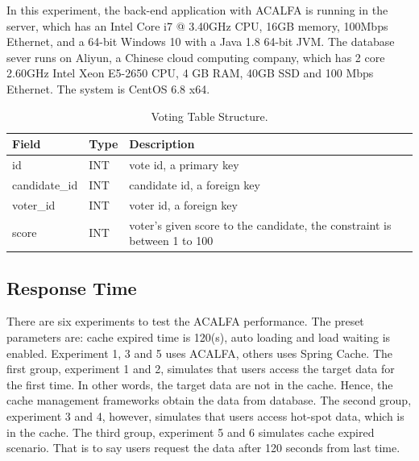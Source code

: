 \documentclass{singlecol-new}
\theoremstyle{TH}{
\newtheorem{lemma}{Lemma}
\newtheorem{theorem}[lemma]{Theorem}
\newtheorem{corrolary}[lemma]{Corrolary}
\newtheorem{conjecture}[lemma]{Conjecture}
\newtheorem{proposition}[lemma]{Proposition}
\newtheorem{claim}[lemma]{Claim}
\newtheorem{stheorem}[lemma]{Wrong Theorem}
}
\theoremstyle{THrm}{
\newtheorem{definition}{Definition}[section]
\newtheorem{question}{Question}[section]
\newtheorem{remark}{Remark}
\newtheorem{scheme}{Scheme}
}
\theoremstyle{THhit}{
\newtheorem{case}{Case}[section]
}
\begin{document}
In this experiment, the back-end application with ACALFA is running in the server, which has an Intel Core i7 @ 3.40GHz CPU, 16GB memory, 100Mbps Ethernet, and a 64-bit Windows 10 with a Java 1.8 64-bit JVM. The database sever runs on Aliyun, a Chinese cloud computing company, which has 2 core 2.60GHz Intel Xeon E5-2650 CPU, 4 GB RAM, 40GB SSD and 100 Mbps Ethernet. The system is CentOS 6.8 x64.

\begin{table}[htb]
\begin{center}
 \caption{\label{VTS}Voting Table Structure.}
 \begin{tabular}{lll}
 \toprule
    \textbf{Field} & \textbf{Type} & \textbf{Description}\\
 \midrule
    id & INT & vote id, a primary key\\
    candidate\_id & INT & candidate id, a foreign key\\
    voter\_id & INT & voter id, a foreign key\\
    score & INT & voter's given score to the candidate, the constraint is between 1 to 100\\
\bottomrule
 \end{tabular}
\end{center}
\end{table}

\subsection{Response Time}

There are six experiments to test the ACALFA performance. The preset parameters are: cache expired time is 120(s), auto loading and load waiting is enabled. Experiment 1, 3 and 5 uses ACALFA, others uses Spring Cache. The first group, experiment 1 and 2, simulates that users access the target data for the first time. In other words, the target data are not in the cache. Hence, the cache management frameworks obtain the data from database. The second group, experiment 3 and 4, however, simulates that users access hot-spot data, which is in the cache. The third group, experiment 5 and 6 simulates cache expired scenario. That is to say users request the data after 120 seconds from last time.
\end{document}
